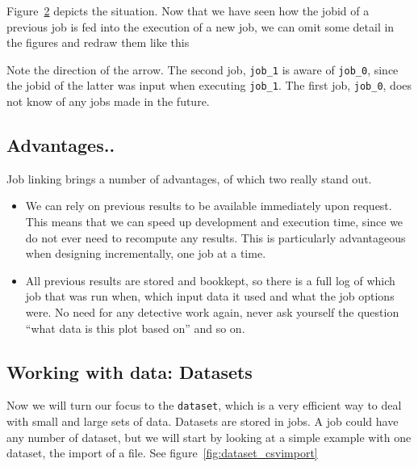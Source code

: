 \documentclass[a4paper]{article}
\begin{document}
\begin{figure}[h!]
  \begin{center}
    
    \caption{}
    \label{fig:run-validate-hello}
  \end{center}
\end{figure}

\noindent Figure~\ref{fig:run-validate-hello} depicts the situation.
Now that we have seen how the jobid of a previous job is fed into the
execution of a new job, we can omit some detail in the figures and
redraw them like this

\begin{figure}[h!]
  \begin{center}
    
    \caption{}
    \label{fig:run-validate-hello}
  \end{center}
\end{figure}

\noindent Note the direction of the arrow.  The second job,
\texttt{job\_1} is aware of \texttt{job\_0}, since the jobid of the
latter was input when executing \texttt{job\_1}.  The first job,
\texttt{job\_0}, does not know of any jobs made in the future.


\subsection{Advantages..}
Job linking brings a number of advantages, of which two really stand out.
\begin{itemize}
\item[] We can rely on previous results to be available immediately
  upon request.  This means that we can speed up development and
  execution time, since we do not ever need to recompute any results.
  This is particularly advantageous when designing incrementally, one
  job at a time.
\item[] All previous results are stored and bookkept, so there is a
  full log of which job that was run when, which input data it used
  and what the job options were.  No need for any detective work
  again, never ask yourself the question ``what data is this plot
  based on'' and so on.
\end{itemize}

\subsection{Working with data: Datasets}
Now we will turn our focus to the \texttt{dataset}, which is a very
efficient way to deal with small and large sets of data.  Datasets are
stored in jobs.  A job could have any number of dataset, but we will
start by looking at a simple example with one dataset, the import of a
file.  See figure~\ref{fig:dataset_csvimport}
\end{document}
